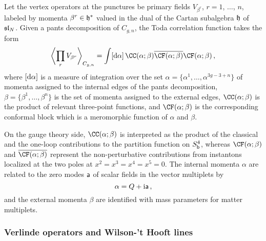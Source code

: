 Let the vertex operators at the punctures be primary fields
$V_{\beta^r}$, $r = 1$, $\dotsc$, $n$, labeled by momenta
$\beta^r \in \mathfrak{h}^*$ valued in the dual of the Cartan subalgebra $\mathfrak{h}$
of $\mathfrak{sl}_N$.  Given a pants decomposition of $C_{g,n}$, the Toda
correlation function takes the form
\begin{equation}
  \biggvev{\prod_r V_{\beta^r}}_{C_{g,n}}
  =
  \int [\rmd\alpha] \,
  \CC(\alpha; \beta)
  \overline{\CF(\alpha; \beta)} \CF(\alpha; \beta) \,,
\end{equation}
where $[\mathrm{d}\alpha]$ is a measure of integration over the set
$\alpha = \{\alpha^1, \dotsc, \alpha^{3g - 3 + n}\}$ of momenta
assigned to the internal edges of the pants decomposition,
$\beta = \{\beta^1, \dotsc, \beta^n\}$ is the set of momenta assigned
to the external edges, $\CC(\alpha; \beta)$ is the product of relevant
three-point functions, and $\CF(\alpha; \beta)$ is the corresponding
conformal block which is a meromorphic function of $\alpha$ and
$\beta$.

On the gauge theory side, $\CC(\alpha; \beta)$ is interpreted as the
product of the classical and the one-loop contributions to the
partition function on $S^4_{\mathsf{b}}$, whereas $\CF(\alpha; \beta)$ and
$\overline{\CF(\alpha; \beta)}$ represent the non-perturbative
contributions from instantons localized at the two poles at
$x^2 = x^3 = x^4 = x^5 = 0$.  The internal momenta $\alpha$ are
related to the zero modes $\mathsf{a}$ of scalar fields in the vector
multiplets by
\begin{equation}
  \alpha = Q + \mathrm{i}\mathsf{a} \,,
\end{equation}
and the external momenta $\beta$ are identified with mass parameters
for matter multiplets.






\subsubsection{Verlinde operators and Wilson-'t Hooft lines}

